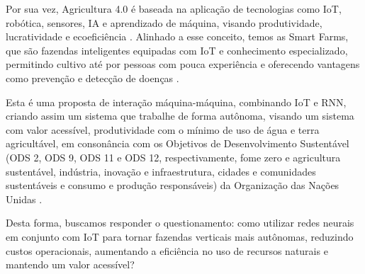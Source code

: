 Por sua vez, Agricultura 4.0 é baseada na aplicação de tecnologias como IoT, robótica, sensores, IA e aprendizado de máquina, visando produtividade, lucratividade e ecoeficiência \cite{lisbinski2020}. Alinhado a esse conceito, temos as Smart Farms, que são fazendas inteligentes equipadas com IoT e conhecimento especializado, permitindo cultivo até por pessoas com pouca experiência e oferecendo vantagens como prevenção e detecção de doenças \cite{ryu2015}.

Esta é uma proposta de interação máquina-máquina, combinando IoT e RNN, criando assim um sistema que trabalhe de forma autônoma, visando um sistema com valor acessível, produtividade com o mínimo de uso de água e terra agricultável, em consonância com os Objetivos de Desenvolvimento Sustentável (ODS 2, ODS 9, ODS 11 e ODS 12, respectivamente, fome zero e agricultura sustentável, indústria, inovação e infraestrutura, cidades e comunidades sustentáveis e consumo e produção responsáveis) da Organização das Nações Unidas \cite{nacoesunidas2024}.

Desta forma, buscamos responder o questionamento: como utilizar redes neurais em conjunto com IoT para tornar fazendas verticais mais autônomas, reduzindo custos operacionais, aumentando a eficiência no uso de recursos naturais e mantendo um valor acessível?